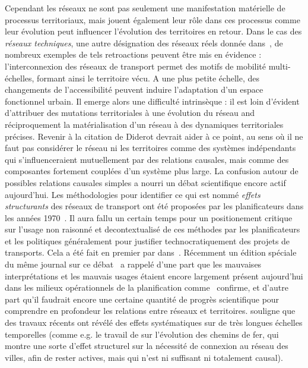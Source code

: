 {}{
Cependant les réseaux ne sont pas seulement une manifestation matérielle de processus territoriaux, mais jouent également leur rôle dans ces processus comme leur évolution peut influencer l'évolution des territoires en retour. Dans le cas des \emph{réseaux techniques}, une autre désignation des réseaux réels donnée dans~\cite{offner1996reseaux}, de nombreux exemples de tels retroactions peuvent être mis en évidence : l'interconnexion des réseaux de transport permet des motifs de mobilité multi-échelles, 
 formant ainsi le territoire vécu. A une plus petite échelle, des changements de l'accessibilité peuvent induire l'adaptation d'un espace fonctionnel urbain. Il emerge alors une difficulté intrinsèque : 
  il est loin d'évident d'attribuer des mutations territoriales à une évolution du réseau and réciproquement la matérialisation d'un réseau à des dynamiques territoriales précises. Revenir à la citation de Diderot devrait aider à ce point, au sens où il ne faut pas considérer le réseau ni les territoires comme des systèmes indépendants qui s'influenceraient mutuellement par des relations causales, mais comme des composantes fortement couplées d'un système plus large. La confusion autour de possibles relations causales simples a nourri un débat scientifique encore actif aujourd'hui. Les méthodologies pour identifier ce qui est nommé \emph{effets structurants} des réseaux de transport ont été proposées par les planificateurs dans les années 1970~\cite{bonnafous1974detection,bonnafous1974methodologies}. 
   Il aura fallu un certain temps pour un positionement critique sur l'usage non raisonné et decontextualisé de ces méthodes par les planificateurs et les politiques généralement pour justifier technocratiquement des projets de transports. Cela a été fait en premier par  dans~\cite{offner1993effets}. Récemment un édition spéciale du même journal sur ce débat~\cite{espacegeo2014effets} a rappelé d'une part que les mauvaises interprétations et les mauvais usages étaient encore largement présent aujourd'hui dans les milieux opérationnels de la planification comme~\cite{crozet:halshs-01094554} confirme, et d'autre part qu'il faudrait encore une certaine quantité de progrès scientifique pour comprendre en profondeur les relations entre réseaux et territoires.  souligne que des travaux récents ont révélé des effets systématiques sur de très longues échelles temporelles (comme e.g. le travail de  sur l'évolution des chemins de fer, qui montre une sorte d'effet structurel sur la nécessité de connexion au réseau des villes, afin de rester actives, mais qui n'est ni suffisant ni totalement causal). 
}
